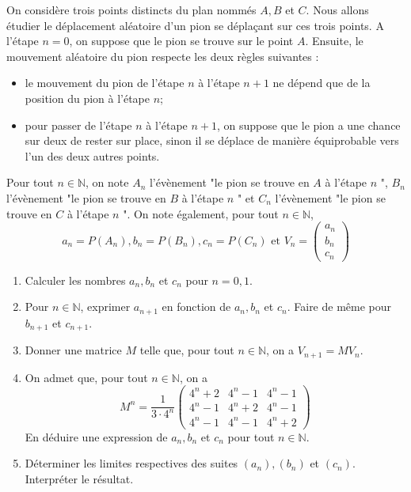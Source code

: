 \documentclass[a4paper, 11pt,reqno]{article}
\begin{document}
\begin{exercice}

On considère trois points distincts du plan nommés $A, B$ et $C$. Nous allons étudier le déplacement aléatoire d'un pion se déplaçant sur ces trois points. A l'étape $n=0$, on suppose que le pion se trouve sur le point $A$. Ensuite, le mouvement aléatoire du pion respecte les deux règles suivantes :
\begin{itemize}
\item  le mouvement du pion de l'étape $n$ à l'étape $n+1$ ne dépend que de la position du pion à l'étape $n$;
\item pour passer de l'étape $n$ à l'étape $n+1$, on suppose que le pion a une chance sur deux de rester sur place, sinon il se déplace de manière équiprobable vers l'un des deux autres points.

\end{itemize}

Pour tout $n \in \mathbb{N}$, on note $A_{n}$ l'évènement "le pion se trouve en $A$ à l'étape $n$ ", $B_{n}$ l'évènement "le pion se trouve en $B$ à l'étape $n$ " et $C_{n}$ l'évènement "le pion se trouve en $C$ à l'étape $n$ ". On note également, pour tout $n \in \mathbb{N}$,
$$
a_{n}=P\left(A_{n}\right), b_{n}=P\left(B_{n}\right), c_{n}=P\left(C_{n}\right) \text { et } V_{n}=\left(\begin{array}{l}
a_{n} \\
b_{n} \\
c_{n}
\end{array}\right)
$$
\begin{enumerate}
\item  Calculer les nombres $a_{n}, b_{n}$ et $c_{n}$ pour $n=0,1$.
\item  Pour $n \in \mathbb{N}$, exprimer $a_{n+1}$ en fonction de $a_{n}, b_{n}$ et $c_{n} .$ Faire de même pour $b_{n+1}$ et $c_{n+1}$.
\item  Donner une matrice $M$ telle que, pour tout $n \in \mathbb{N}$, on a $V_{n+1}=M V_{n}$.
\item  On admet que, pour tout $n \in \mathbb{N}$, on a
$$
M^{n}=\frac{1}{3 \cdot 4^{n}}\left(\begin{array}{ccc}
4^{n}+2 & 4^{n}-1 & 4^{n}-1 \\
4^{n}-1 & 4^{n}+2 & 4^{n}-1 \\
4^{n}-1 & 4^{n}-1 & 4^{n}+2
\end{array}\right)
$$
En déduire une expression de $a_{n}, b_{n}$ et $c_{n}$ pour tout $n \in \mathbb{N}$.
\item  Déterminer les limites respectives des suites $\left(a_{n}\right),\left(b_{n}\right)$ et $\left(c_{n}\right)$. Interpréter le résultat.
\end{enumerate}


\end{exercice}
\end{document}
